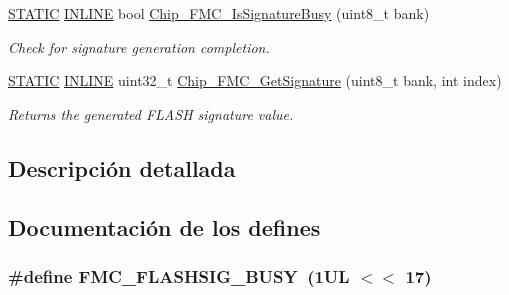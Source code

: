 \begin{DoxyCompactItemize}
\hyperlink{group___l_p_c___types___public___macros_ga10b2d890d871e1489bb02b7e70d9bdfb}{S\+T\+A\+T\+IC} \hyperlink{spifi__18xx__43xx_8h_a2eb6f9e0395b47b8d5e3eeae4fe0c116}{I\+N\+L\+I\+NE} bool \hyperlink{group___f_m_c__18_x_x__43_x_x_gaaa287615692d7b693b16ea2b92bb5763}{Chip\+\_\+\+F\+M\+C\+\_\+\+Is\+Signature\+Busy} (uint8\+\_\+t bank)
\begin{DoxyCompactList}\small\item\em Check for signature generation completion. \end{DoxyCompactList}\item 
\hyperlink{group___l_p_c___types___public___macros_ga10b2d890d871e1489bb02b7e70d9bdfb}{S\+T\+A\+T\+IC} \hyperlink{spifi__18xx__43xx_8h_a2eb6f9e0395b47b8d5e3eeae4fe0c116}{I\+N\+L\+I\+NE} uint32\+\_\+t \hyperlink{group___f_m_c__18_x_x__43_x_x_gae1022883a7bf2e9094d76e2a9b0aafc6}{Chip\+\_\+\+F\+M\+C\+\_\+\+Get\+Signature} (uint8\+\_\+t bank, int index)
\begin{DoxyCompactList}\small\item\em Returns the generated F\+L\+A\+SH signature value. \end{DoxyCompactList}\end{DoxyCompactItemize}


\subsection{Descripción detallada}


\subsection{Documentación de los \textquotesingle{}defines\textquotesingle{}}
\subsubsection[{\texorpdfstring{F\+M\+C\+\_\+\+F\+L\+A\+S\+H\+S\+I\+G\+\_\+\+B\+U\+SY}{FMC_FLASHSIG_BUSY}}]{\setlength{\rightskip}{0pt plus 5cm}\#define F\+M\+C\+\_\+\+F\+L\+A\+S\+H\+S\+I\+G\+\_\+\+B\+U\+SY~(1\+U\+L $<$$<$ 17)}\hypertarget{group___f_m_c__18_x_x__43_x_x_ga1c732efb3127d9e699c46b4a89706639}{}\label{group___f_m_c__18_x_x__43_x_x_ga1c732efb3127d9e699c46b4a89706639}


